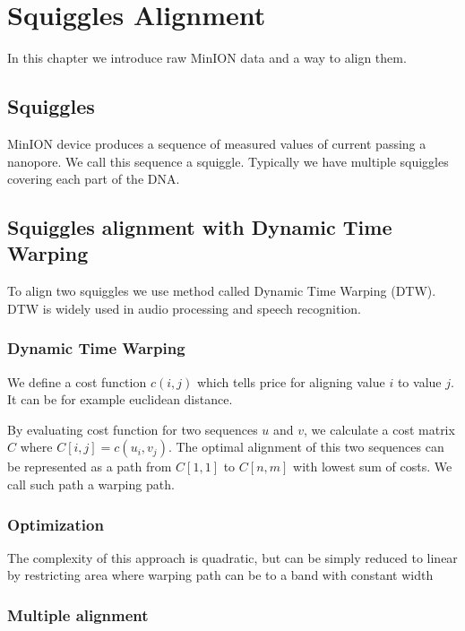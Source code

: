 \chapter{Squiggles Alignment}

\label{kap:squiggles} %

In this chapter we introduce raw MinION data and a way to align them.

\section{Squiggles}

MinION device produces a sequence of measured values of current passing a nanopore. We call this sequence a squiggle.
Typically we have multiple squiggles covering each part of the DNA.

\section{Squiggles alignment with Dynamic Time Warping}
To align two squiggles we use method called Dynamic Time Warping (DTW).
DTW is widely used in audio processing and speech recognition.

\subsection{Dynamic Time Warping}
We define a cost function $c(i,j)$ which tells price for aligning value $i$ to value $j$. It can be for example euclidean distance.

By evaluating cost function for two sequences $u$ and $v$, we calculate a cost matrix $C$ where $C[i,j]=c(u_i,v_j)$.
The optimal alignment of this two sequences can be represented as a path from $C[1,1]$ to $C[n,m]$ with lowest sum of costs. We call such path a warping path.

\subsection{Optimization}
The complexity of this approach is quadratic, but can be simply reduced to linear by restricting area where warping path can be to a band with constant width

\subsection{Multiple alignment}
